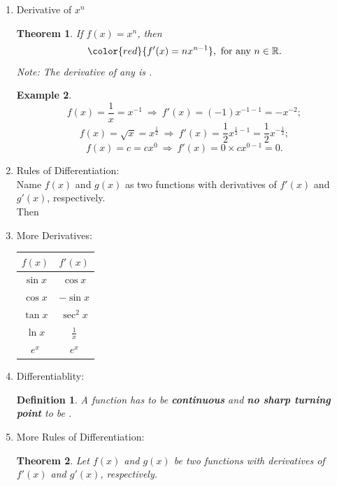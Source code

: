 \documentclass[12pt, a4paper]{article}
\newtheorem{theorem}{Theorem}[subsection]
\newtheorem{definition}{Definition}[subsection]
\newtheorem{example}{Example}[subsection]
\begin{document}
\begin{enumerate}
\begin{itemize}
\begin{example}
        At $x=3$, $f'(3)=2\times 3=6.$ The gradient is $6.$
    \end{example}
    \end{itemize}
    \item Derivative of $x^n$
    \begin{theorem}
        If $f(x)=x^n$, then 
        $${\color{red}{f'(x)=nx^{n-1}}},\ \text{for any } n \in \mathbb{R}.$$
        Note: The derivative of any {\color{red}{constant}} is {\color{red}{0}}.
    \end{theorem}
    \begin{example}
        $$f(x)=\frac{1}{x}=x^{-1}\ \Rightarrow\ f'(x)=(-1)x^{-1-1}=-x^{-2};$$
        $$f(x)=\sqrt{x}=x^{\frac{1}{2}}\ \Rightarrow\ f'(x)=\frac{1}{2}x^{\frac{1}{2}-1}=\frac{1}{2}x^{-\frac{1}{2}};$$
        $$f(x)=c=cx^0\ \Rightarrow\ f'(x)=0\times cx^{0-1}=0.$$
    \end{example}
    \item Rules of Differentiation: \\
    Name $f(x)$ and $g(x)$ as two functions with derivatives of $f'(x)$ and $g'(x)$, respectively.\\
    Then {\color{red}{$$\left(cf(x)\right)'=cf'(x)$$
    $$\left(f(x)\pm g(x)\right)'=f'(x)\pm g'(x)$$}}
    \item More Derivatives: 
    \begin{center}\begin{tabular}{c|c}
        $f(x)$&$f'(x)$\\ \hline
        $\sin x$&$\cos x$\\ 
        $\cos x$&$-\sin x$\\ 
        $\tan x$&$\sec^2x$\\
        $\ln x$&$\frac{1}{x}$\\
        $e^x$&$e^x$
    \end{tabular}\end{center}
    \item Differentiablity: 
    \begin{definition}
        A function has to be \textbf{continuous} and \textbf{no sharp turning point} to be \textbf{\color{red}{differentiable}}.\\
        {\color{green}{Note: Smooth turning point on the graph is allowed.}}
    \end{definition}
    \item More Rules of Differentiation: 
    \begin{theorem}
        Let $f(x)$ and $g(x)$ be two functions with derivatives of $f'(x)$ and $g'(x)$, respectively.

\end{theorem}
\end{enumerate}
\end{document}
